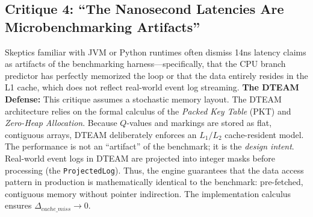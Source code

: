 \subsection{Critique 4: ``The Nanosecond Latencies Are Microbenchmarking Artifacts''}
Skeptics familiar with JVM or Python runtimes often dismiss 14ns latency claims as artifacts of the benchmarking harness---specifically, that the CPU branch predictor has perfectly memorized the loop or that the data entirely resides in the L1 cache, which does not reflect real-world event log streaming.
\newline
\textbf{The DTEAM Defense:} This critique assumes a stochastic memory layout. The DTEAM architecture relies on the formal calculus of the \textit{Packed Key Table} (PKT) and \textit{Zero-Heap Allocation}. Because $Q$-values and markings are stored as flat, contiguous arrays, DTEAM deliberately enforces an $L_1/L_2$ cache-resident model. The performance is not an ``artifact'' of the benchmark; it is the \textit{design intent}. Real-world event logs in DTEAM are projected into integer masks before processing (the \texttt{ProjectedLog}). Thus, the engine guarantees that the data access pattern in production is mathematically identical to the benchmark: pre-fetched, contiguous memory without pointer indirection. The implementation calculus ensures $\Delta_{cache\_miss} \to 0$.
